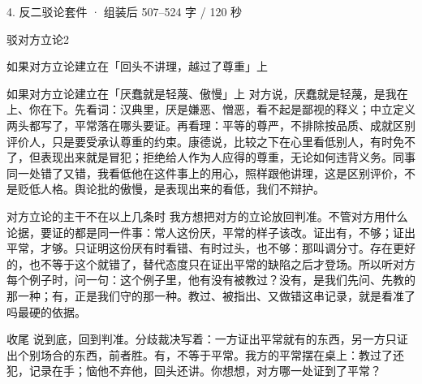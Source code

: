 \documentclass[script,con]{debate}
\begin{document}
\begin{kit}{4. 反二驳论}{套件 · 组装后 507–524 字 / 120 秒}
\begin{pick}{驳对方立论}{2}
\begin{module}{如果对方立论建立在「回头不讲理，越过了尊重」上}
\end{module}
\begin{module}{如果对方立论建立在「厌蠢就是轻蔑、傲慢」上}
对方说，厌蠢就是轻蔑，是我在上、你在下。先看词：汉典里，厌是嫌恶、憎恶，看不起是鄙视的释义；中立定义两头都写了，平常落在哪头要证。再看理：平等的尊严，不排除按品质、成就区别评价人，只是要受承认尊重的约束。康德说，比较之下在心里看低别人，有时免不了，但表现出来就是冒犯；拒绝给人作为人应得的尊重，无论如何违背义务。同事同一处错了又错，我看低他在这件事上的用心，照样跟他讲理，这是区别评价，不是贬低人格。舆论批的傲慢，是表现出来的看低，我们不辩护。
\end{module}
\begin{fallback}{对方立论的主干不在以上几条时}
我方想把对方的立论放回判准。不管对方用什么论据，要证的都是同一件事：常人这份厌，平常的样子该改。证出有，不够；证出平常，才够。只证明这份厌有时看错、有时过头，也不够：那叫调分寸。存在更好的，也不等于这个就错了，替代态度只在证出平常的缺陷之后才登场。所以听对方每个例子时，问一句：这个例子里，他有没有被教过？没有，是我们先问、先教的那一种；有，正是我们守的那一种。教过、被指出、又做错这串记录，就是看准了吗最硬的依据。
\end{fallback}
\end{pick}
\begin{fixed}{收尾}
说到底，回到判准。分歧裁决写着：一方证出平常就有的东西，另一方只证出个别场合的东西，前者胜。有，不等于平常。我方的平常摆在桌上：教过了还犯，记录在手；恼他不弃他，回头还讲。你想想，对方哪一处证到了平常？
\end{fixed}
\end{kit}
\end{document}
